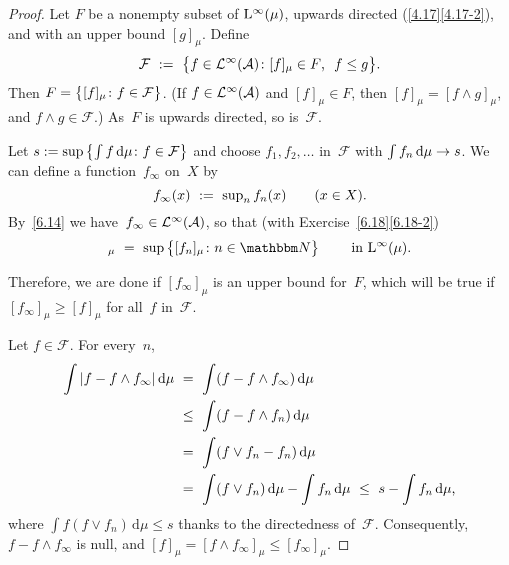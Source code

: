 \documentclass[main.tex]{subfiles}
\begin{document}
\begin{proof}
Let $F$ be a nonempty subset of $\mathrm{L}^\infty(\mu)$,
upwards directed (\ref{4.17}\ref{4.17-2}), and
with an upper bound $[g]_\mu$.
Define
\begin{equation*}
\mathcal{F}\ :=\ \bigl\{ f\in\mathcal{L}^\infty(\mathcal{A})\colon
  [f]_\mu\in F\text{, }\ f\leq g\bigr\}\text{.}
\end{equation*}
Then $F=\smash{\bigl\{[f]_\mu\colon f\in\mathcal F\bigr\}}$.
(If $f\in\mathcal{L}^\infty(\mathcal A)$ and $[f]_\mu\in F$,
then $[f]_\mu = [f\wedge g]_\mu$,
and $f\wedge g\in\mathcal F$.)
As~$F$ is upwards directed, so is~$\mathcal F$.

Let $s:=\sup\smash{\bigl\{\int f\,\mathrm{d}\mu\colon
f\in\mathcal F\bigr\}}$ and choose $f_1,f_2,\dotsc$ in~$\mathcal F$
with $\int f_n\,\mathrm{d}\mu\rightarrow s$.
We can define a function~$f_\infty$ on~$X$ by
\begin{equation*}
f_\infty(x)\ :=\ \textstyle \sup_n f_n(x)\qquad(x\in X)\text{.}
\end{equation*}
By~\ref{6.14} we have~$f_\infty\in\mathcal{L}^\infty(\mathcal A)$,
so that (with Exercise~\ref{6.18}\ref{6.18-2})
\begin{equation*}
[f_\infty]_\mu\ =\ \sup\,\bigl\{[f_n]_\mu\colon n\in\N\bigr\}
\qquad\htam{ in }\BNL(\mu)\htam{.}
\end{equation*}

Therefore,
we are done if $[f_\infty]_\mu$
is an upper bound for~$F$,
which will be true if $[f_\infty]_\mu\geq [f]_\mu$
for all~$f$ in~$\mathcal F$.

Let $f\in\mathcal F$.
For every~$n$,
\begin{alignat*}{2}
\int |f-f\wedge f_\infty |\,\mathrm{d}\mu
\ &=\ \int (f-f\wedge f_\infty)\,\mathrm{d}\mu  \\
\ &\leq\ \int(f-f\wedge f_n)\,\mathrm{d}\mu \\
\ &=\ \int(f\vee f_n -f_n)\,\mathrm{d}\mu \\
\ &=\ \int(f\vee f_n)\,\mathrm{d}\mu 
      -\int f_n\,\mathrm{d}\mu
\ \leq\ s-\int f_n\,\mathrm{d}\mu\text{,}
\end{alignat*}
where $\int f(f\vee f_n)\,\mathrm{d}\mu\leq s$
thanks to the directedness of~$\mathcal F$.
Consequently,
$f-f\wedge f_\infty$ is null,
and $[f]_\mu= [f\wedge f_\infty]_\mu\leq [f_\infty]_\mu$. \xqed
\end{proof}
%
%
\end{document}
